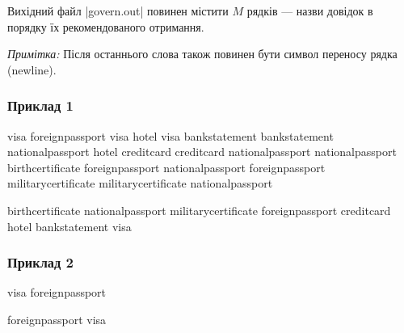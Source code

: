 \documentclass[12pt,a4paper]{article}
\begin{document}
Вихідний файл |govern.out| повинен містити \(M\) рядків --- назви довідок в порядку їх рекомендованого отримання.

\emph{Примітка:} Після останнього слова також повинен бути символ переносу рядка (newline).


\pagebreak


\subsubsection*{Приклад 1}

\textbf{}

\begin{codeblock}
visa foreignpassport
visa hotel
visa bankstatement
bankstatement nationalpassport
hotel creditcard
creditcard nationalpassport
nationalpassport birthcertificate
foreignpassport nationalpassport
foreignpassport militarycertificate
militarycertificate nationalpassport
\end{codeblock}

\textbf{}

\begin{codeblock}
birthcertificate
nationalpassport
militarycertificate
foreignpassport
creditcard
hotel
bankstatement
visa
\end{codeblock}


\subsubsection*{Приклад 2}

\textbf{}

\begin{codeblock}
visa foreignpassport
\end{codeblock}

\textbf{}

\begin{codeblock}
foreignpassport
visa
\end{codeblock}
\end{document}
